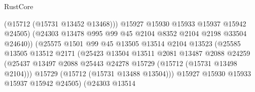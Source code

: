 \begin{lexlean}{RustCore}
\begin{coremodule}
                                          (@15712 (@15731 @13452 @13468)))
                                        @15927
                                        @15930
                                        @15933
                                        @15937
                                        @15942
                                        @24505)
                                      (@24303
                                        @13478
                                        @995
                                        @99
                                        @45
                                        @2104
                                        @8352
                                        @2104
                                        @2198
                                        @33504
                                        @24640))
                                    (@25575
                                      @1501
                                      @99
                                      @45
                                      @13505
                                      @13514
                                      @2104
                                      @13523
                                      (@25585
                                        @13505
                                        @13512
                                        @2171
                                        (@25423
                                          @13504
                                          @13511
                                          @2081
                                          @13487
                                          @2088
                                          @24259
                                          (@25437
                                            @13497
                                            @2088
                                            @25443
                                            @24278
                                            @15729
                                            (@15712 (@15731 @13498 @2104)))
                                          @15729
                                          (@15712 (@15731 @13488 @13504)))
                                        @15927
                                        @15930
                                        @15933
                                        @15937
                                        @15942
                                        @24505)
                                      (@24303
                                        @13514

\end{coremodule}
\end{lexlean}
